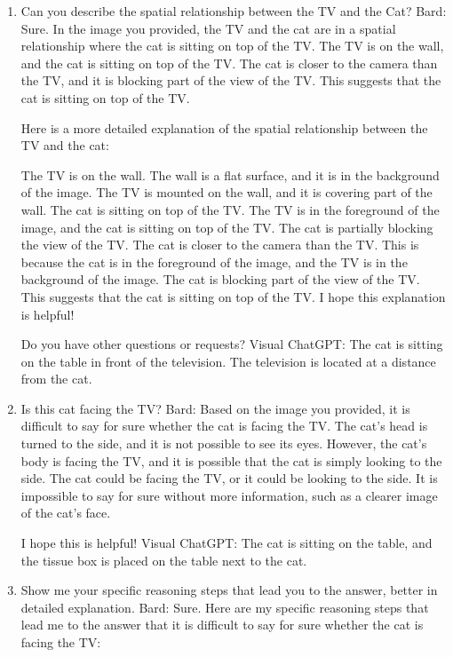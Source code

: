 \begin{enumerate}
    \item Can you describe the spatial relationship between the TV and the Cat?
    \subitem Bard: 
    Sure. In the image you provided, the TV and the cat are in a spatial relationship where the cat is sitting on top of the TV. The TV is on the wall, and the cat is sitting on top of the TV. The cat is closer to the camera than the TV, and it is blocking part of the view of the TV. This suggests that the cat is sitting on top of the TV.

    Here is a more detailed explanation of the spatial relationship between the TV and the cat:

    The TV is on the wall. The wall is a flat surface, and it is in the background of the image. The TV is mounted on the wall, and it is covering part of the wall.
    The cat is sitting on top of the TV. The TV is in the foreground of the image, and the cat is sitting on top of the TV. The cat is partially blocking the view of the TV.
    The cat is closer to the camera than the TV. This is because the cat is in the foreground of the image, and the TV is in the background of the image.
    The cat is blocking part of the view of the TV. This suggests that the cat is sitting on top of the TV.
    I hope this explanation is helpful!

    Do you have other questions or requests?
    \subitem Visual ChatGPT: The cat is sitting on the table in front of the television. The television is located at a distance from the cat.
    \item Is this cat facing the TV?
    \subitem Bard: Based on the image you provided, it is difficult to say for sure whether the cat is facing the TV. The cat's head is turned to the side, and it is not possible to see its eyes. However, the cat's body is facing the TV, and it is possible that the cat is simply looking to the side. The cat could be facing the TV, or it could be looking to the side. It is impossible to say for sure without more information, such as a clearer image of the cat's face.

    I hope this is helpful!
    \subitem Visual ChatGPT: The cat is sitting on the table, and the tissue box is placed on the table next to the cat.
    \item Show me your specific reasoning steps that lead you to the answer, better in detailed explanation.
    \subitem Bard: Sure. Here are my specific reasoning steps that lead me to the answer that it is difficult to say for sure whether the cat is facing the TV:


\end{enumerate}
